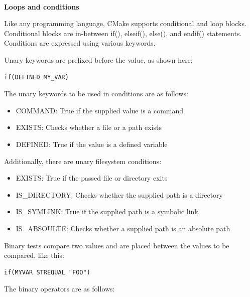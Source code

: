 \hspace*{\fill} \\ %
\noindent
\textbf{Loops and conditions}

Like any programming language, CMake supports conditional and loop blocks. Conditional blocks are in-between if(), elseif(), else(), and endif() statements. Conditions are expressed using various keywords.

Unary keywords are prefixed before the value, as shown here:

\begin{lstlisting}[style=styleCMake]
if(DEFINED MY_VAR)
\end{lstlisting}

The unary keywords to be used in conditions are as follows:

\begin{itemize}
\item 
COMMAND: True if the supplied value is a command

\item 
EXISTS: Checks whether a file or a path exists

\item 
DEFINED: True if the value is a defined variable
\end{itemize}

Additionally, there are unary filesystem conditions:

\begin{itemize}
\item 
EXISTS: True if the passed file or directory exits

\item 
IS\_DIRECTORY: Checks whether the supplied path is a directory

\item 
IS\_SYMLINK: True if the supplied path is a symbolic link

\item 
IS\_ABSOULTE: Checks whether a supplied path is an absolute path
\end{itemize}

Binary tests compare two values and are placed between the values to be compared, like this:

\begin{lstlisting}[style=styleCMake]
if(MYVAR STREQUAL "FOO")
\end{lstlisting}

The binary operators are as follows:

